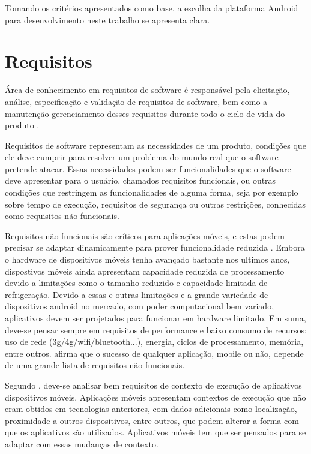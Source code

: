 Tomando os critérios apresentados como base, a escolha da plataforma Android para desenvolvimento neste trabalho se apresenta clara.

\section{Requisitos}

Área de conhecimento em requisitos de software é responsável pela elicitação, análise, especificação e validação de requisitos de software, bem como a manutenção gerenciamento desses requisitos durante todo o ciclo de vida do produto \cite{swebok}.

Requisitos de software representam as necessidades de um produto, condições que ele deve cumprir para resolver um problema do mundo real que o software pretende atacar. Essas necessidades podem ser funcionalidades que o software deve apresentar para o usuário, chamados requisitos funcionais, ou outras condições que restringem as funcionalidades de alguma forma, seja por exemplo sobre tempo de execução, requisitos de segurança ou outras restrições, conhecidas como requisitos não funcionais.

Requisitos não funcionais são críticos para aplicações móveis, e estas podem precisar se adaptar dinamicamente para prover funcionalidade reduzida \cite{eswmobile}. Embora o hardware de dispositivos móveis tenha avançado bastante nos ultimos anos, dispostivos móveis ainda apresentam capacidade reduzida de processamento devido a limitações como o tamanho reduzido e capacidade limitada de refrigeração. Devido a essas e outras limitações e a grande variedade de dispositivos android no mercado, com poder computacional bem variado, aplicativos devem ser projetados para funcionar em hardware limitado. Em suma, deve-se pensar sempre em requisitos de performance e baixo consumo de recursos: uso de rede (3g/4g/wifi/bluetooth...), energia, ciclos de processamento, memória, entre outros.  afirma que o sucesso de qualquer aplicação, mobile ou não, depende de uma grande lista de requisitos não funcionais.  

Segundo , deve-se analisar bem requisitos de contexto de execução de aplicativos dispositivos móveis. Aplicações móveis apresentam contextos de execução que não eram obtidos em tecnologias anteriores, com dados adicionais como localização, proximidade a outros dispositivos, entre outros, que podem alterar a forma com que os aplicativos são utilizados. Aplicativos móveis tem que ser pensados para se adaptar com essas mudanças de contexto.

